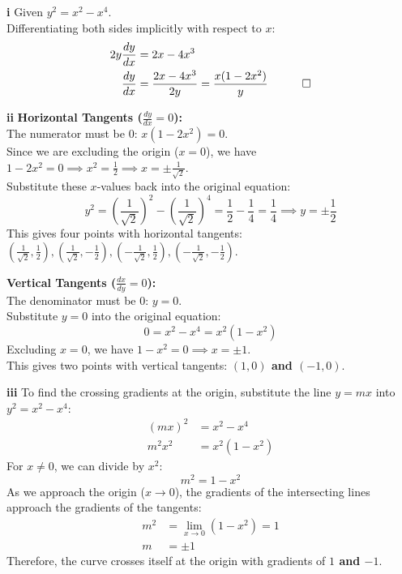 \begin{solution}
\textbf{i} Given $y^2 = x^2 - x^4$. \\
Differentiating both sides implicitly with respect to $x$:
\begin{align*}
    2y \frac{dy}{dx} &= 2x - 4x^3 \\
    \frac{dy}{dx} &= \frac{2x - 4x^3}{2y} = \frac{x(1 - 2x^2)}{y} \quad \qed
\end{align*}

\vspace{0.3cm}
\textbf{ii} \textbf{Horizontal Tangents ($\frac{dy}{dx} = 0$):} \\
The numerator must be $0$: $x(1 - 2x^2) = 0$. \\
Since we are excluding the origin ($x=0$), we have $1 - 2x^2 = 0 \implies x^2 = \frac{1}{2} \implies x = \pm \frac{1}{\sqrt{2}}$. \\
Substitute these $x$-values back into the original equation:
\[ y^2 = \left(\frac{1}{\sqrt{2}}\right)^2 - \left(\frac{1}{\sqrt{2}}\right)^4 = \frac{1}{2} - \frac{1}{4} = \frac{1}{4} \implies y = \pm \frac{1}{2} \]
This gives four points with horizontal tangents: \textbf{$\left(\frac{1}{\sqrt{2}}, \frac{1}{2}\right), \left(\frac{1}{\sqrt{2}}, -\frac{1}{2}\right), \left(-\frac{1}{\sqrt{2}}, \frac{1}{2}\right), \left(-\frac{1}{\sqrt{2}}, -\frac{1}{2}\right)$}.

\textbf{Vertical Tangents ($\frac{dx}{dy} = 0$):} \\
The denominator must be $0$: $y = 0$. \\
Substitute $y = 0$ into the original equation:
\[ 0 = x^2 - x^4 = x^2(1 - x^2) \]
Excluding $x=0$, we have $1 - x^2 = 0 \implies x = \pm 1$. \\
This gives two points with vertical tangents: \textbf{$(1, 0)$ and $(-1, 0)$}.

\vspace{0.3cm}
\textbf{iii} To find the crossing gradients at the origin, substitute the line $y = mx$ into $y^2 = x^2 - x^4$:
\begin{align*}
    (mx)^2 &= x^2 - x^4 \\
    m^2x^2 &= x^2(1 - x^2)
\end{align*}
For $x \neq 0$, we can divide by $x^2$:
\[ m^2 = 1 - x^2 \]
As we approach the origin ($x \to 0$), the gradients of the intersecting lines approach the gradients of the tangents:
\begin{align*}
    m^2 &= \lim_{x \to 0} (1 - x^2) = 1 \\
    m &= \pm 1
\end{align*}
Therefore, the curve crosses itself at the origin with gradients of \textbf{$1$ and $-1$}.


\end{solution}

